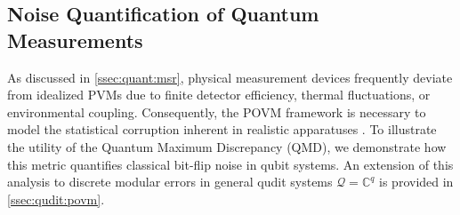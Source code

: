 \documentclass[noinfoline]{imsart}\setcounter{tocdepth}{2}
\renewcommand{\b}[1]{\mathbb{#1}} %
\renewcommand{\c}[1]{\mathcal{#1}} %
\theoremstyle{plain}
\begin{document}
\subsection{Noise Quantification of Quantum Measurements}\label{ssec:uq:povm}
As discussed in \cref{ssec:quant:msr}, physical measurement devices frequently deviate from idealized PVMs due to finite detector efficiency, thermal fluctuations, or environmental coupling. Consequently, the POVM framework is necessary to model the statistical corruption inherent in realistic apparatuses \cite{busch2016quantum, breuer2002theory}. To illustrate the utility of the Quantum Maximum Discrepancy (QMD), we demonstrate how this metric quantifies classical bit-flip noise in qubit systems. An extension of this analysis to discrete modular errors in general qudit systems $\c{Q} = \b{C}^{q}$ is provided in \cref{ssec:qudit:povm}.
\end{document}
